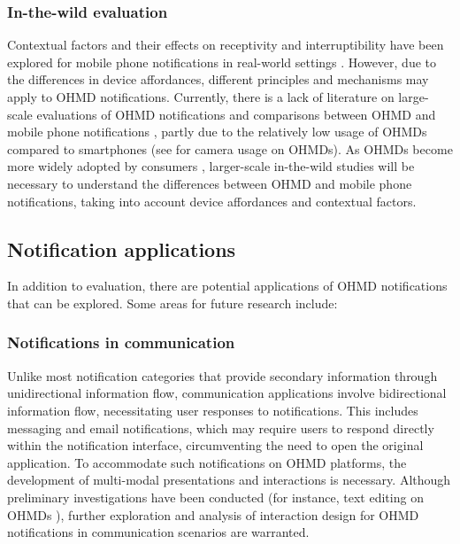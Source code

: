 \subsubsection*{In-the-wild evaluation}

Contextual factors and their effects on receptivity and interruptibility have been explored for mobile phone notifications in real-world settings \cite{anderson_survey_2018, mehrotra_intelligent_2018}. However, due to the differences in device affordances, different principles and mechanisms may apply to OHMD notifications. Currently, there is a lack of literature on large-scale evaluations of OHMD notifications and comparisons between OHMD and mobile phone notifications \cite{sahami_shirazi_large_scale_2014, pielot_situ_2014}, partly due to the relatively low usage of OHMDs compared to smartphones (see \cite{bipat_analyzing_2019} for camera usage on OHMDs). As OHMDs become more widely adopted by consumers \cite{alsop_ar_2022}, larger-scale in-the-wild studies will be necessary to understand the differences between OHMD and mobile phone notifications, taking into account device affordances and contextual factors.

\subsection{Notification applications}

In addition to evaluation, there are potential applications of OHMD notifications that can be explored. Some areas for future research include:

\subsubsection*{Notifications in communication}

Unlike most notification categories that provide secondary information through unidirectional information flow, communication applications involve bidirectional information flow, necessitating user responses to notifications. This includes messaging and email notifications, which may require users to respond directly within the notification interface, circumventing the need to open the original application. To accommodate such notifications on OHMD platforms, the development of multi-modal presentations and interactions is necessary. Although preliminary investigations have been conducted (for instance, text editing on OHMDs \cite{ghosh_eyeditor_2020}), further exploration and analysis of interaction design for OHMD notifications in communication scenarios are warranted.


